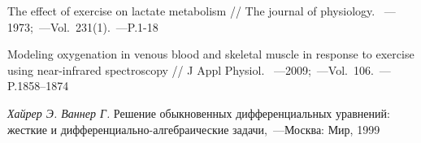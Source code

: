 \begin{thebibliography}{}
   The effect of exercise on lactate metabolism // The journal of physiology. ~---1973;~---Vol.~231(1).~---P.1-18
  
   Modeling oxygenation in venous blood and skeletal muscle in response
to exercise using near-infrared spectroscopy // J Appl Physiol. ~---2009;~---Vol.~106.~---P.1858–1874
  
 {\it Хайрер Э. Ваннер Г.} Решение обыкновенных дифференциальных уравнений: жесткие и дифференциально-алгебраические задачи,~---Москва:  Мир, 1999  

\end{thebibliography}
